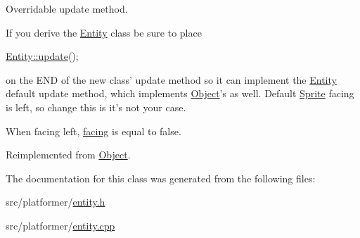 Overridable update method. 

If you derive the \hyperlink{class_entity}{Entity} class be sure to place 
\begin{DoxyCode}
\hyperlink{class_entity_a00b6eeaf99b35c8f8b10b5fbfc1baf4f}{Entity::update}();
\end{DoxyCode}
 on the E\-N\-D of the new class' update method so it can implement the \hyperlink{class_entity}{Entity} default update method, which implements \hyperlink{class_object}{Object}'s as well. Default \hyperlink{class_sprite}{Sprite} facing is left, so change this is it's not your case.

When facing left, \hyperlink{}{facing} is equal to false. 

Reimplemented from \hyperlink{class_object_a4abd48bacb1b004c8ac891597c831f77}{Object}.



The documentation for this class was generated from the following files\-:\begin{DoxyCompactItemize}
\item 
src/platformer/\hyperlink{entity_8h}{entity.\-h}\item 
src/platformer/\hyperlink{entity_8cpp}{entity.\-cpp}\end{DoxyCompactItemize}
